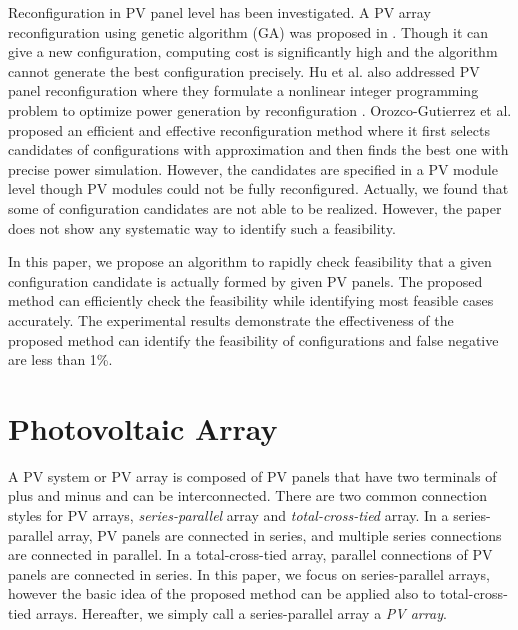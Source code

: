 \documentclass[conference]{pvsctran}
\begin{document}
Reconfiguration in PV panel level has been investigated\cite{carotenuto2015evolutionary,hu2017non,orozco2016optimized}. 
A PV array reconfiguration using genetic algorithm (GA) was proposed in \cite{carotenuto2015evolutionary}. Though it can give a new configuration, computing cost is significantly high and the algorithm cannot generate the best configuration precisely.  
Hu et al. also addressed PV panel reconfiguration where they formulate a nonlinear integer programming problem to optimize power generation by reconfiguration \cite{hu2017non}.
Orozco-Gutierrez et al. proposed an efficient and effective reconfiguration method\cite{orozco2016optimized} where it first selects candidates of configurations with approximation and then finds the best one with precise power simulation. 
However, the candidates are specified in a PV module level though PV modules could not be fully reconfigured. Actually, we found that some of configuration candidates are not able to be realized. However, the paper\cite{orozco2016optimized}  does not show any systematic way to identify such a feasibility. 

In this paper, we propose an algorithm to rapidly check feasibility that a given configuration candidate is actually formed by given PV panels. 
The proposed method can efficiently check the feasibility while identifying most feasible cases accurately. 
The experimental results demonstrate the effectiveness of the proposed method can identify the feasibility of configurations and false negative are less than 1\%.





\section{Photovoltaic Array}

A PV system or PV array is composed of PV panels that have two terminals of plus and minus and can be interconnected.
There are two common connection styles for PV arrays, \textit{series-parallel} array and \textit{total-cross-tied} array. 
In a series-parallel array, PV panels are connected in series, and multiple series connections are connected in parallel. 
In a total-cross-tied array, parallel connections of PV panels are connected in series. 
In this paper, we focus on series-parallel arrays, however the basic idea of the proposed method can be applied also to total-cross-tied arrays. 
Hereafter, we simply call a series-parallel array a \textit{PV array}. 
\end{document}
